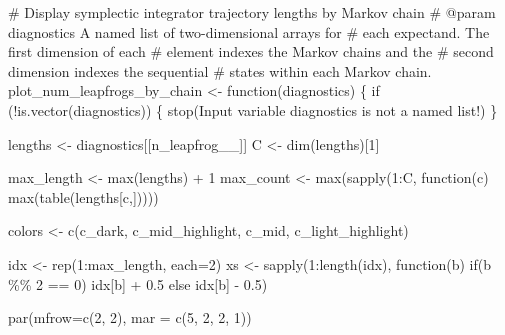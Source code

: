 \documentclass[
  letterpaper,
  DIV=11,
  numbers=noendperiod]{scrartcl}
\newenvironment{Shaded}{\begin{snugshade}}{\end{snugshade}}
\newcommand{\BuiltInTok}[1]{\textcolor[rgb]{0.00,0.23,0.31}{#1}}
\newcommand{\CommentTok}[1]{\textcolor[rgb]{0.37,0.37,0.37}{#1}}
\newcommand{\ControlFlowTok}[1]{\textcolor[rgb]{0.00,0.23,0.31}{#1}}
\newcommand{\DecValTok}[1]{\textcolor[rgb]{0.68,0.00,0.00}{#1}}
\newcommand{\FloatTok}[1]{\textcolor[rgb]{0.68,0.00,0.00}{#1}}
\newcommand{\KeywordTok}[1]{\textcolor[rgb]{0.00,0.23,0.31}{#1}}
\newcommand{\NormalTok}[1]{\textcolor[rgb]{0.00,0.23,0.31}{#1}}
\newcommand{\OperatorTok}[1]{\textcolor[rgb]{0.37,0.37,0.37}{#1}}
\newcommand{\StringTok}[1]{\textcolor[rgb]{0.13,0.47,0.30}{#1}}
\begin{document}
\begin{Shaded}
\begin{Highlighting}[]
\CommentTok{\# Display symplectic integrator trajectory lengths by Markov chain}
\CommentTok{\# @param diagnostics A named list of two{-}dimensional arrays for }
\CommentTok{\#                    each expectand.  The first dimension of each}
\CommentTok{\#                    element indexes the Markov chains and the }
\CommentTok{\#                    second dimension indexes the sequential }
\CommentTok{\#                    states within each Markov chain.}
\NormalTok{plot\_num\_leapfrogs\_by\_chain }\OperatorTok{\textless{}{-}}\NormalTok{ function(diagnostics) \{}
  \ControlFlowTok{if}\NormalTok{ (}\OperatorTok{!}\KeywordTok{is}\NormalTok{.vector(diagnostics)) \{}
\NormalTok{    stop(}\StringTok{\textquotesingle{}Input variable \textasciigrave{}diagnostics\textasciigrave{} is not a named list!\textquotesingle{}}\NormalTok{)}
\NormalTok{  \}}
  
\NormalTok{  lengths }\OperatorTok{\textless{}{-}}\NormalTok{ diagnostics[[}\StringTok{\textquotesingle{}n\_leapfrog\_\_\textquotesingle{}}\NormalTok{]]}
\NormalTok{  C }\OperatorTok{\textless{}{-}}\NormalTok{ dim(lengths)[}\DecValTok{1}\NormalTok{]}

\NormalTok{  max\_length }\OperatorTok{\textless{}{-}} \BuiltInTok{max}\NormalTok{(lengths) }\OperatorTok{+} \DecValTok{1}
\NormalTok{  max\_count }\OperatorTok{\textless{}{-}} \BuiltInTok{max}\NormalTok{(sapply(}\DecValTok{1}\NormalTok{:C, function(c) }\BuiltInTok{max}\NormalTok{(table(lengths[c,]))))}

\NormalTok{  colors }\OperatorTok{\textless{}{-}}\NormalTok{ c(c\_dark, c\_mid\_highlight, c\_mid, c\_light\_highlight)}

\NormalTok{  idx }\OperatorTok{\textless{}{-}}\NormalTok{ rep(}\DecValTok{1}\NormalTok{:max\_length, each}\OperatorTok{=}\DecValTok{2}\NormalTok{)}
\NormalTok{  xs }\OperatorTok{\textless{}{-}}\NormalTok{ sapply(}\DecValTok{1}\NormalTok{:length(idx), function(b) }\ControlFlowTok{if}\NormalTok{(b }\OperatorTok{\%\%} \DecValTok{2} \OperatorTok{==} \DecValTok{0}\NormalTok{) idx[b] }\OperatorTok{+} \FloatTok{0.5}
                                          \ControlFlowTok{else}\NormalTok{ idx[b] }\OperatorTok{{-}} \FloatTok{0.5}\NormalTok{)}

\NormalTok{  par(mfrow}\OperatorTok{=}\NormalTok{c(}\DecValTok{2}\NormalTok{, }\DecValTok{2}\NormalTok{), mar }\OperatorTok{=}\NormalTok{ c(}\DecValTok{5}\NormalTok{, }\DecValTok{2}\NormalTok{, }\DecValTok{2}\NormalTok{, }\DecValTok{1}\NormalTok{))}


\end{Highlighting}
\end{Shaded}
\end{document}
